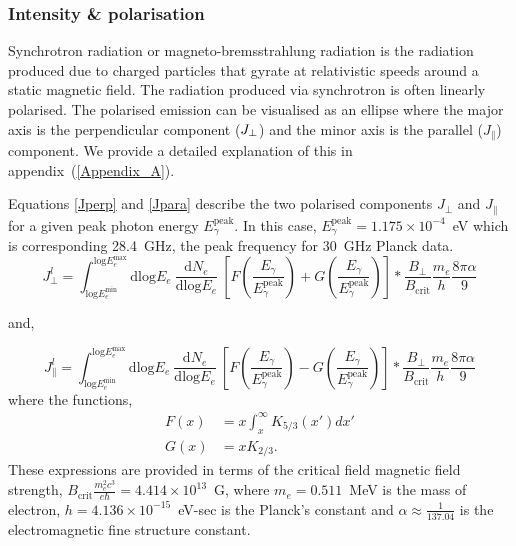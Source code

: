 \documentclass[12pt, a4 paper]{article}
\begin{document}
\subsubsection{Intensity \& polarisation}
Synchrotron radiation or magneto-bremsstrahlung radiation is the radiation produced due to charged particles that gyrate at relativistic speeds around a static magnetic field. The radiation produced via synchrotron is often linearly polarised.
The polarised emission can be visualised as an ellipse where the major axis is the perpendicular component ($J_{\rm \perp}$) and the minor axis is the parallel ($J_{\parallel}$) component. We provide a detailed explanation of this in appendix~(\ref{Appendix_A}). 

Equations \ref{Jperp} and \ref{Jpara} describe the two polarised components $J_{\perp}$ and $J_{\parallel}$ for a  given peak photon energy $E_{\gamma}^{\mathrm{peak}}$. In this case, $E_{\gamma}^{\mathrm{peak}} = 1.175 \times 10^{-4}$~eV which is corresponding 28.4~GHz, the peak frequency for 30~GHz Planck data.
\begin{equation}\label{Jperp}
 {J_{\perp}^l} =   \int_{\mathrm{log}E_e^{\mathrm{min}}}^{\mathrm{log}E_e^{\mathrm{max}}}\mathrm{dlog}E_{e} \  \frac{\mathrm{d}N_e}{\mathrm{dlog}E_{e}} \  \left[F\left(\frac{E_{\gamma}}{E_{\gamma}^{\mathrm{peak}}}\right) + G\left(\frac{E_{\gamma}}{E_{\gamma}^{\mathrm{peak}}}\right)\right] * \frac{B_{\perp}}{B_{\mathrm{crit}}}\frac{m_{e}}{h} \frac{8\pi \alpha}{9} 
\end{equation}

and,

\begin{equation}\label{Jpara}
{J_{\parallel}^l} = \int_{\mathrm{log}E_e^{\mathrm{min}}}^{\mathrm{log}E_e^{\mathrm{max}}}\mathrm{dlog}E_{e} \ \frac{\mathrm{d}N_e}{\mathrm{dlog}E_{e}} \  \left[F\left(\frac{E_{\gamma}}{E_{\gamma}^{\mathrm{peak}}}\right) - G\left(\frac{E_{\gamma}}{E_{\gamma}^{\mathrm{peak}}}\right)\right] * \frac{B_{\perp}}{B_{\mathrm{crit}}}\frac{m_{e}}{h} \frac{8\pi \alpha}{9}
\end{equation}
where the functions,
\begin{align}
F(x) &= x \int_x^\infty K_{5/3}(x') dx'\\
G(x) &= x K_{2/3}.
\end{align}
These expressions are provided in terms of the critical field magnetic field strength, $B_{\mathrm{crit}} \frac{m_e^2c^3}{e\hbar} = 4.414 \times 10^{13}$~G, where $m_e = 0.511$~MeV is the mass of electron, $h = 4.136 \times 10^{-15}$~eV-sec is the Planck's constant and $\alpha \approx \frac{1}{137.04}$ is the electromagnetic fine structure constant.
\end{document}
